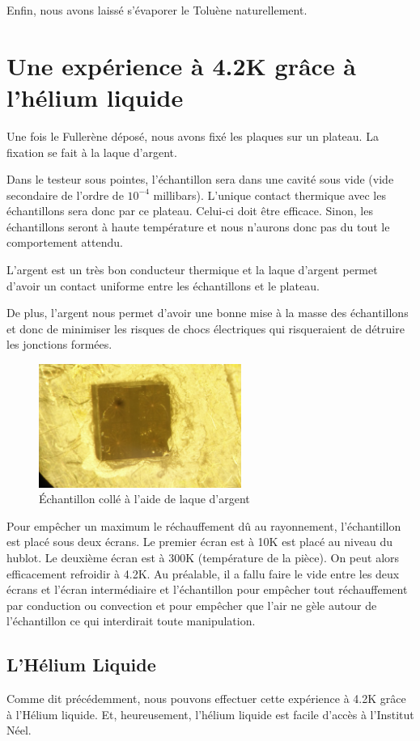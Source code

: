 Enfin, nous avons laissé s'évaporer le Toluène naturellement.
\section{Une expérience à 4.2K grâce à l'hélium liquide}
Une fois le Fullerène déposé, nous avons fixé les plaques sur un plateau. La fixation se fait à la laque d'argent.

Dans le testeur sous pointes, l'échantillon sera dans une cavité sous vide (vide secondaire de l'ordre de $10^{-4}$ millibars). L'unique contact thermique avec les échantillons sera donc par ce plateau. Celui-ci doit être efficace. Sinon, les échantillons seront à haute température et nous n'aurons donc pas du tout le comportement attendu.

L'argent est un très bon conducteur thermique et la laque d'argent permet d'avoir un contact uniforme entre les échantillons et le plateau.

De plus, l'argent nous permet d'avoir une bonne mise à la masse des échantillons et donc de minimiser les risques de chocs électriques qui risqueraient de détruire les jonctions formées.
\begin{figure}[h]
    \begin{center}
        \includegraphics[width=250px]{Images/3_PhotoPlaqueTransistors}
        \caption{Échantillon collé à l'aide de laque d'argent}
    \end{center}
\end{figure}

Pour empêcher un maximum le réchauffement dû au rayonnement, l'échantillon est placé sous deux écrans. Le premier écran est à 10K est placé au niveau du hublot. Le deuxième écran est à 300K (température de la pièce). On peut alors efficacement refroidir à 4.2K. Au préalable, il a fallu faire le vide entre les deux écrans et l'écran intermédiaire et l'échantillon pour empêcher tout réchauffement par conduction ou convection et pour empêcher que l'air ne gèle autour de l'échantillon ce qui interdirait toute manipulation.
\subsection{L'Hélium Liquide}
Comme dit précédemment, nous pouvons effectuer cette expérience à 4.2K grâce à l'Hélium liquide. Et, heureusement, l'hélium liquide est facile d'accès à l'Institut Néel.

